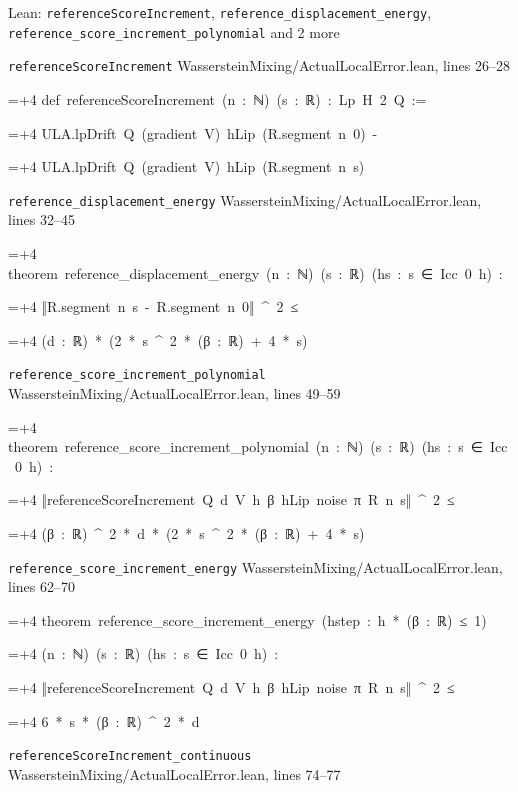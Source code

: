\documentclass[11pt,a4paper]{article}
\newlength{\leancharwidth}
\newenvironment{leancode}{\par\smallskip\begingroup\ttfamily\footnotesize\raggedright
  \settowidth{\leancharwidth}{M}\setlength{\parskip}{0pt}\setlength{\parindent}{0pt}
  \frenchspacing}{\par\endgroup\smallskip}
\newcommand{\leanline}[2]{\hangindent=\dimexpr#1\leancharwidth+4\leancharwidth\relax
  \hangafter=1\noindent\hspace*{#1\leancharwidth}#2\par}
\newcommand{\leansource}[1]{\par{\footnotesize\color{leanmuted}#1}\par}
\begin{document}
\begin{leanbox}{Lean: \texttt{referenceScoreIncrement}, \texttt{reference\_\allowbreak{}displacement\_\allowbreak{}energy}, \texttt{reference\_\allowbreak{}score\_\allowbreak{}increment\_\allowbreak{}polynomial} and 2 more}
\leansource{\texttt{referenceScoreIncrement} \quad WassersteinMixing/\allowbreak{}ActualLocalError.lean, lines 26–28}
\begin{leancode}
\leanline{0}{def\ referenceScoreIncrement\ (n\ :\ ℕ)\ (s\ :\ ℝ)\ :\ Lp\ H\ 2\ Q\ :=}
\leanline{2}{ULA.lpDrift\ Q\ (gradient\ V)\ hLip\ (R.segment\ n\ 0)\ -}
\leanline{4}{ULA.lpDrift\ Q\ (gradient\ V)\ hLip\ (R.segment\ n\ s)}
\end{leancode}
\leansource{\texttt{reference\_\allowbreak{}displacement\_\allowbreak{}energy} \quad WassersteinMixing/\allowbreak{}ActualLocalError.lean, lines 32–45}
\begin{leancode}
\leanline{0}{theorem\ reference\_displacement\_energy\ (n\ :\ ℕ)\ (s\ :\ ℝ)\ (hs\ :\ s\ ∈\ Icc\ 0\ h)\ :}
\leanline{4}{‖R.segment\ n\ s\ -\ R.segment\ n\ 0‖\ \textasciicircum{}\ 2\ ≤}
\leanline{6}{(d\ :\ ℝ)\ *\ (2\ *\ s\ \textasciicircum{}\ 2\ *\ (β\ :\ ℝ)\ +\ 4\ *\ s)}
\end{leancode}
\leansource{\texttt{reference\_\allowbreak{}score\_\allowbreak{}increment\_\allowbreak{}polynomial} \quad WassersteinMixing/\allowbreak{}ActualLocalError.lean, lines 49–59}
\begin{leancode}
\leanline{0}{theorem\ reference\_score\_increment\_polynomial\ (n\ :\ ℕ)\ (s\ :\ ℝ)\ (hs\ :\ s\ ∈\ Icc\ 0\ h)\ :}
\leanline{4}{‖referenceScoreIncrement\ Q\ d\ V\ h\ β\ hLip\ noise\ π\ R\ n\ s‖\ \textasciicircum{}\ 2\ ≤}
\leanline{6}{(β\ :\ ℝ)\ \textasciicircum{}\ 2\ *\ d\ *\ (2\ *\ s\ \textasciicircum{}\ 2\ *\ (β\ :\ ℝ)\ +\ 4\ *\ s)}
\end{leancode}
\leansource{\texttt{reference\_\allowbreak{}score\_\allowbreak{}increment\_\allowbreak{}energy} \quad WassersteinMixing/\allowbreak{}ActualLocalError.lean, lines 62–70}
\begin{leancode}
\leanline{0}{theorem\ reference\_score\_increment\_energy\ (hstep\ :\ h\ *\ (β\ :\ ℝ)\ ≤\ 1)}
\leanline{4}{(n\ :\ ℕ)\ (s\ :\ ℝ)\ (hs\ :\ s\ ∈\ Icc\ 0\ h)\ :}
\leanline{4}{‖referenceScoreIncrement\ Q\ d\ V\ h\ β\ hLip\ noise\ π\ R\ n\ s‖\ \textasciicircum{}\ 2\ ≤}
\leanline{6}{6\ *\ s\ *\ (β\ :\ ℝ)\ \textasciicircum{}\ 2\ *\ d}
\end{leancode}
\leansource{\texttt{referenceScoreIncrement\_\allowbreak{}continuous} \quad WassersteinMixing/\allowbreak{}ActualLocalError.lean, lines 74–77}

\end{leanbox}
\end{document}

